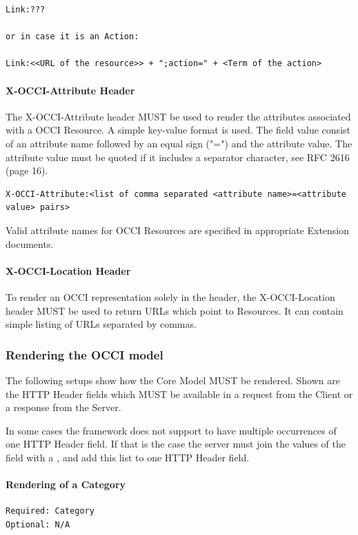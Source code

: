 \documentclass[10pt,a4paper]{article}
\begin{document}
\begin{verbatim}
Link:???

or in case it is an Action:

Link:<<URL of the resource>> + ";action=" + <Term of the action>
\end{verbatim}

\paragraph{X-OCCI-Attribute Header}

The X-OCCI-Attribute header MUST be used to render the attributes associated with a OCCI Resource. A simple key-value format is used. The field value consist of an attribute name followed by an equal sign ("=") and the attribute value. The attribute value must be quoted if it includes a separator character, see RFC 2616 (page 16).

\begin{verbatim}
X-OCCI-Attribute:<list of comma separated <attribute name>=<attribute value> pairs>
\end{verbatim}

Valid attribute names for OCCI Resources are specified in appropriate Extension documents.

\paragraph{X-OCCI-Location Header}

To render an OCCI representation solely in the header, the X-OCCI-Location header MUST be used to return URLs which point to Resources. It can contain simple listing of URLs separated by commas.

\subsubsection{Rendering the OCCI model}

The following setups show how the Core Model MUST be rendered. Shown are the HTTP Header fields which MUST be available in a request from the Client or a response from the Server.

In some cases the framework does not support to have multiple occurrences of one HTTP Header field. If that is the case the server must join the values of the field with a \emph{,} and add this list to one HTTP Header field.

\paragraph{Rendering of a Category}
\begin{verbatim}
Required: Category
Optional: N/A
\end{verbatim}
\end{document}
